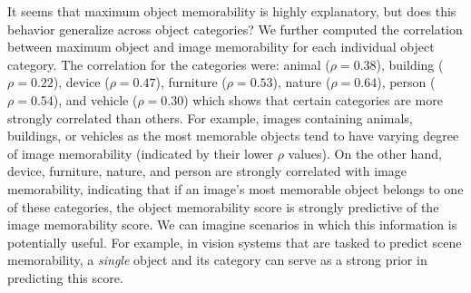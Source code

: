 It seems that maximum object memorability is highly explanatory, but does this behavior generalize across object categories? We further computed the correlation between maximum object and image memorability for each individual object category. The correlation for the categories were: animal ($\rho=0.38$), building ($\rho=0.22$), device ($\rho=0.47$), furniture ($\rho=0.53$), nature ($\rho=0.64$), person ($\rho=0.54$), and vehicle ($\rho=0.30$) which shows that certain categories are more strongly correlated than others. For example, images containing animals, buildings, or vehicles as the most memorable objects tend to have varying degree of image memorability (indicated by their lower $\rho$ values). On the other hand, device, furniture, nature, and person are strongly correlated with image memorability, indicating that if an image's most memorable object belongs to one of these categories, the object memorability score is strongly predictive of the image memorability score. We can imagine scenarios in which this information is potentially useful. For example, in vision systems that are tasked to predict scene memorability, a \textit{single} object and its category can serve as a strong prior in predicting this score.






